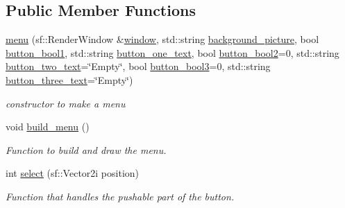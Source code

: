 \subsection*{Public Member Functions}
\begin{DoxyCompactItemize}
\item 
\hyperlink{classmenu_a1c6f1319ba2123f9654df695725e83b4}{menu} (sf\+::\+Render\+Window \&\hyperlink{classmenu_a27f2df7cf63febffe1c3c5a5e13ffb8d}{window}, std\+::string \hyperlink{classmenu_af403beeeb7beef5621f0ea806c9f3e6e}{background\+\_\+picture}, bool \hyperlink{classmenu_a044c86b2b6cd959a53f4e92caf34f7a0}{button\+\_\+bool1}, std\+::string \hyperlink{classmenu_a460e3d024e939e6469aede94fd86a64c}{button\+\_\+one\+\_\+text}, bool \hyperlink{classmenu_a043c728ce292a4d87e5e59c9c3db13b9}{button\+\_\+bool2}=0, std\+::string \hyperlink{classmenu_a027f3482fde6a4991ff4036e9e0472bd}{button\+\_\+two\+\_\+text}=\char`\"{}Empty\char`\"{}, bool \hyperlink{classmenu_a469661400ee077af1b949bac629d30c7}{button\+\_\+bool3}=0, std\+::string \hyperlink{classmenu_ac785c6419d139d0181e0487805657e32}{button\+\_\+three\+\_\+text}=\char`\"{}Empty\char`\"{})
\begin{DoxyCompactList}\small\item\em constructor to make a menu \end{DoxyCompactList}\item 
void \hyperlink{classmenu_a8d194b462b1b180086e5b06a2dbfbdff}{build\+\_\+menu} ()
\begin{DoxyCompactList}\small\item\em Function to build and draw the menu. \end{DoxyCompactList}\item 
int \hyperlink{classmenu_a06744d58a2aad693d3637d0485aa7984}{select} (sf\+::\+Vector2i position)
\begin{DoxyCompactList}\small\item\em Function that handles the pushable part of the button. \end{DoxyCompactList}\end{DoxyCompactItemize}
